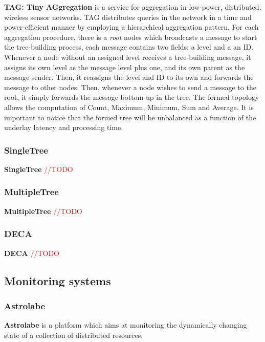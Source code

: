 \textbf{TAG: Tiny AGgregation}\cite{Madden2002} is a service for aggregation in low-power, distributed, wireless sensor networks. TAG distributes queries in the network in a time and power-efficient manner by employing a hierarchical aggregation pattern. For each aggregation procedure, there is a \textit{root} nodes which broadcasts a message to start the tree-building process, each message contains two fields: a level and a an ID. Whenever a node without an assigned level receives a tree-building message, it assigns its own level as the message level plus one, and its own parent as the message sender. Then, it reassigns the level and ID to its own and forwards the message to other nodes. Then, whenever a node wishes to send a message to the root, it simply forwards the message bottom-up in the tree. The formed topology allows the computation of Count, Maximum, Minimum, Sum and Average. It is important to notice that the formed tree will be unbalanced as a function of the underlay latency and processing time.

\subsubsection{SingleTree} 

\textbf{SingleTree} \cite{} \textcolor{red}{//TODO}

\subsubsection{MultipleTree} 

\textbf{MultipleTree} \cite{} \textcolor{red}{//TODO}

\subsubsection{DECA} \textbf{DECA} \cite{Artigas2006} \textcolor{red}{//TODO}

\subsection{Monitoring systems}

\subsubsection{Astrolabe}

\textbf{Astrolabe} \cite{Renesse2003} is a platform which aims at monitoring the dynamically changing state of a collection of distributed resources. 

